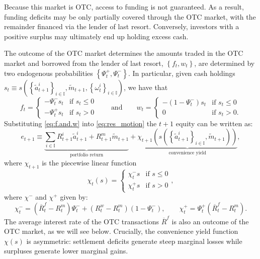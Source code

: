 \documentclass[12pt,american,english,notitlepage]{article}
\begin{document}
Because this market is OTC, access to funding is not guaranteed. As a result, funding deficits may be only partially covered through the
OTC market, with the remainder financed via the lender of last resort.
Conversely, investors with a positive surplus may ultimately end up
holding excess cash.

The outcome of the OTC market determines the amounts traded in the OTC market and borrowed from the lender of last resort, $\left\{ f_{t},w_{t}\right\} $,
are determined by two endogenous probabilities $\left\{ \Psi_{t}^{+},\Psi_{t}^{-}\right\} $.
In particular, given cash holdings $s_{t}\equiv s\left(\left\{ \tilde{a}_{t+1}^{i}\right\} _{i\in\mathbb{I}},\tilde{m}_{t+1},\left\{ \omega_{t}^{i}\right\} _{i\in\mathbb{I}}\right)$, we have that
\begin{equation}
f_{t}=\begin{cases}
-\Psi_{t}^{-}s_{t} & \text{if }s_{t}\leq0\\
-\Psi_{t}^{+}s_{t} & \text{if }s_{t}>0
\end{cases}\qquad\text{and}\qquad w_{t}=\begin{cases}
-(1-\Psi_{t}^{-})s_{t} & \text{if }s_{t}\leq0\\
0 & \text{if }s_{t}>0.
\end{cases}\label{eq:f.and.w}
\end{equation}
 Substituting \eqref{eq:f.and.w}
into \eqref{eq:res_motion} the $t+1$ equity can be written as: 
\begin{equation}
e_{t+1}\equiv\underbrace{\sum_{i\in\mathbb{I}}R_{t+1}^{i}\tilde{a}_{t+1}^{i}+R_{t+1}^{m}\tilde{m}_{t+1}}_{\text{portfolio return}}+\underbrace{\chi_{t+1}\left(s\left(\left\{ \tilde{a}_{t+1}^{i}\right\} _{i\in\mathbb{I}},\tilde{m}_{t+1}\right)\right)}_{\text{convenience yield}},\label{eq:total.E.returns}
\end{equation}
where $\chi_{t+1}$ is the piecewise linear function
\begin{equation}
\chi_{t}(s)=\begin{cases}
\chi_{t}^{-}s & \text{if }s\leq0\\
\chi_{t}^{+}s & \text{if }s>0
\end{cases},\label{eq:chi}
\end{equation}
where $\chi^{-}$ and $\chi^{+}$ given by: 
\begin{equation}
\chi_{t}^{-}=(\overline{R}_{t}^{f}-R_{t}^{m})\Psi_{t}^{-}+(R_{t}^{w}-R_{t}^{m})(1-\Psi_{t}^{-}),\qquad\chi_{t}^{+}=\Psi_{t}^{+}(\overline{R}_{t}^{f}-R_{t}^{m}).\label{eq:Chi.Function}
\end{equation}
The average interest rate of the OTC transactions 
$\overline R^f$ is also an outcome of the OTC market, as we will see below. Crucially, the convenience yield function $\chi(s)$ is asymmetric:  settlement deficits generate steep marginal losses while surpluses generate lower marginal gains.
\end{document}
